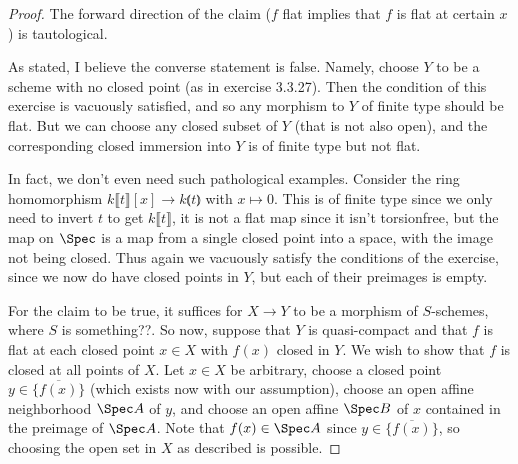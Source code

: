 \begin{proof}
	The forward direction of the claim ($f$ flat implies that $f$ is flat at certain $x$) is tautological.
	
	As stated, I believe the converse statement is false. Namely, choose $Y$ to be a scheme with no closed point (as in exercise 3.3.27). Then the condition of this exercise is vacuously satisfied, and so any morphism to $Y$ of finite type should be flat. But we can choose any closed subset of $Y$ (that is not also open), and the corresponding closed immersion into $Y$ is of finite type but not flat.
	
	In fact, we don't even need such pathological examples. Consider the ring homomorphism $k\lBrack t \rBrack [x] \to k \lParen t \rParen$ with $x \mapsto 0$. This is of finite type since we only need to invert $t$ to get $k \lBrack t \rBrack$, it is not a flat map since it isn't torsionfree, but the map on $\Spec$ is a map from a single closed point into a space, with the image not being closed. Thus again we vacuously satisfy the conditions of the exercise, since we now do have closed points in $Y$, but each of their preimages is empty.
	
	For the claim to be true, it suffices for $X \to Y$ to be a morphism of $S$-schemes, where $S$ is something??. So now, suppose that $Y$ is quasi-compact and that $f$ is flat at each closed point $x \in X$ with $f(x)$ closed in $Y$. We wish to show that $f$ is closed at all points of $X$. Let $x \in X$ be arbitrary, choose a closed point $y \in \overline{\{f(x)\}}$ (which exists now with our assumption), choose an open affine neighborhood $\Spec A$ of $y$, and choose an open affine $\Spec B$ of $x$ contained in the preimage of $\Spec A$. Note that $f(x) \in \Spec A$ since $y \in \overline{\{f(x)\}}$, so choosing the open set in $X$ as described is possible.
\end{proof}
